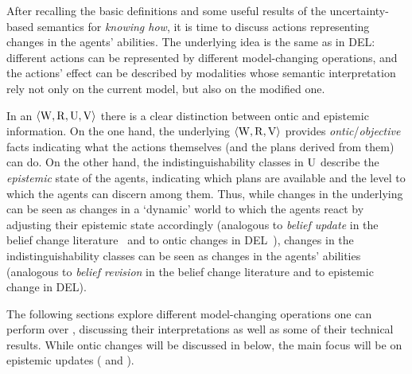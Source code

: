\medskip

After recalling the basic definitions and some useful results of the uncertainty-based semantics for \emph{knowing how}, it is time to discuss actions representing changes in the agents' abilities. The underlying idea is the same as in DEL: different actions can be represented by different model-changing operations, and the actions' effect can be described by modalities whose semantic interpretation rely not only on the current model, but also on the modified one. 

In an \ults $\langle \operatorname{W},\operatorname{R},\operatorname{U},\operatorname{V} \rangle$ there is a clear distinction between ontic and epistemic information. On the one hand, the underlying \lts $\langle \operatorname{W},\operatorname{R},\operatorname{V} \rangle$ provides \emph{ontic}/\emph{objective} facts indicating what the actions themselves (and the plans derived from them) can do. On the other hand, the indistinguishability classes in $\operatorname{U}$ describe the \emph{epistemic} state of the agents, indicating which plans are available and the level to which the agents can discern among them. Thus, while changes in the underlying \lts can be seen as changes in a `dynamic' world to which the agents react by adjusting their epistemic state accordingly (analogous to  \emph{belief update} in the belief change literature~\cite{sep-logic-belief-revision} and to ontic changes in DEL~\cite{vanDitmarschKooi2008}), changes in the indistinguishability classes can be seen as changes in the agents' abilities (analogous to \emph{belief revision} in the belief change literature and to epistemic change in DEL).

The following sections explore different model-changing operations one can perform over \ultss, discussing their interpretations as well as some of their technical results. While ontic changes will be discussed in  below, the main focus will be on epistemic updates ( and ).





